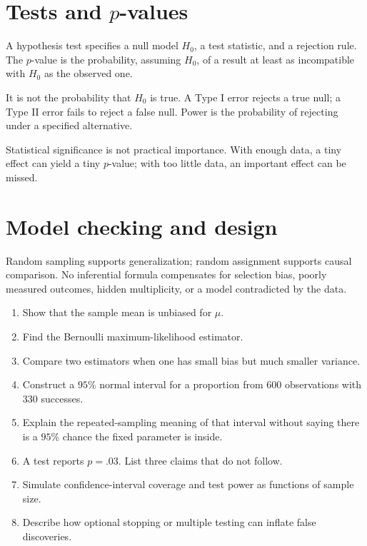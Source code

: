 \section{Tests and \texorpdfstring{$p$}{p}-values}

A hypothesis test specifies a null model $H_0$, a test statistic, and a rejection rule. The $p$-value is the probability, assuming $H_0$, of a result at least as incompatible with $H_0$ as the observed one.

It is not the probability that $H_0$ is true. A Type I error rejects a true null; a Type II error fails to reject a false null. Power is the probability of rejecting under a specified alternative.

\begin{warningbox}
Statistical significance is not practical importance. With enough data, a tiny effect can yield a tiny $p$-value; with too little data, an important effect can be missed.
\end{warningbox}

\section{Model checking and design}

Random sampling supports generalization; random assignment supports causal comparison. No inferential formula compensates for selection bias, poorly measured outcomes, hidden multiplicity, or a model contradicted by the data.

\begin{exercisebox}
\begin{enumerate}
  \item Show that the sample mean is unbiased for $\mu$. 
  \item Find the Bernoulli maximum-likelihood estimator. 
  \item Compare two estimators when one has small bias but much smaller variance. 
  \item Construct a $95\%$ normal interval for a proportion from 600 observations with 330 successes. 
  \item Explain the repeated-sampling meaning of that interval without saying there is a $95\%$ chance the fixed parameter is inside. 
  \item A test reports $p=.03$. List three claims that do not follow. 
  \item Simulate confidence-interval coverage and test power as functions of sample size. 
  \item Describe how optional stopping or multiple testing can inflate false discoveries. 
\end{enumerate}
\end{exercisebox}
